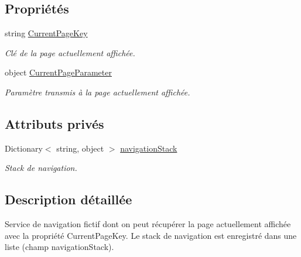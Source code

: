 \subsection*{Propriétés}
\begin{DoxyCompactItemize}
\item 
string \hyperlink{class_boxes_1_1_tests_1_1_mock_1_1_services_1_1_fake_navigation_service_ac56e00a3392fc0d8370e34f2b3665021}{Current\+Page\+Key}
\begin{DoxyCompactList}\small\item\em Clé de la page actuellement affichée. \end{DoxyCompactList}\item 
object \hyperlink{class_boxes_1_1_tests_1_1_mock_1_1_services_1_1_fake_navigation_service_a6a5a1f38263717cf9dbfada81deb79d3}{Current\+Page\+Parameter}
\begin{DoxyCompactList}\small\item\em Paramètre transmis à la page actuellement affichée. \end{DoxyCompactList}\end{DoxyCompactItemize}
\subsection*{Attributs privés}
\begin{DoxyCompactItemize}
\item 
Dictionary$<$ string, object $>$ \hyperlink{class_boxes_1_1_tests_1_1_mock_1_1_services_1_1_fake_navigation_service_ad295920ed186a7b945b3597c635f12e0}{navigation\+Stack}
\begin{DoxyCompactList}\small\item\em Stack de navigation. \end{DoxyCompactList}\end{DoxyCompactItemize}


\subsection{Description détaillée}
Service de navigation fictif dont on peut récupérer la page actuellement affichée avec la propriété {\ttfamily Current\+Page\+Key}. Le stack de navigation est enregistré dans une liste (champ {\ttfamily navigation\+Stack}). 



